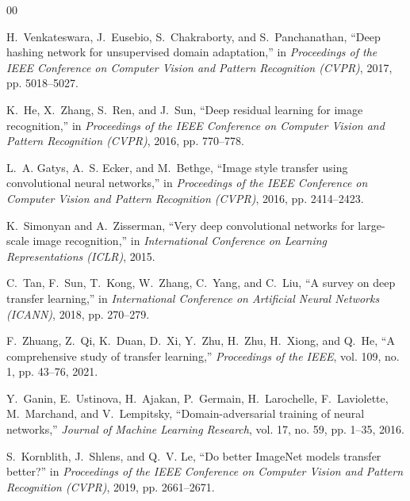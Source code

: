 \documentclass[conference]{IEEEtran}
\begin{document}
\FloatBarrier
\begin{thebibliography}{00}

H.~Venkateswara, J.~Eusebio, S.~Chakraborty, and S.~Panchanathan,
``Deep hashing network for unsupervised domain adaptation,''
in \textit{Proceedings of the IEEE Conference on Computer Vision and Pattern
Recognition (CVPR)}, 2017, pp. 5018--5027.

K.~He, X.~Zhang, S.~Ren, and J.~Sun,
``Deep residual learning for image recognition,''
in \textit{Proceedings of the IEEE Conference on Computer Vision and Pattern
Recognition (CVPR)}, 2016, pp. 770--778.

L.~A. Gatys, A.~S. Ecker, and M.~Bethge,
``Image style transfer using convolutional neural networks,''
in \textit{Proceedings of the IEEE Conference on Computer Vision and Pattern
Recognition (CVPR)}, 2016, pp. 2414--2423.

K.~Simonyan and A.~Zisserman,
``Very deep convolutional networks for large-scale image recognition,''
in \textit{International Conference on Learning Representations (ICLR)}, 2015.

C.~Tan, F.~Sun, T.~Kong, W.~Zhang, C.~Yang, and C.~Liu,
``A survey on deep transfer learning,''
in \textit{International Conference on Artificial Neural Networks (ICANN)}, 2018,
pp. 270--279.

F.~Zhuang, Z.~Qi, K.~Duan, D.~Xi, Y.~Zhu, H.~Zhu, H.~Xiong, and Q.~He,
``A comprehensive study of transfer learning,''
\textit{Proceedings of the IEEE}, vol. 109, no. 1, pp. 43--76, 2021.

Y.~Ganin, E.~Ustinova, H.~Ajakan, P.~Germain, H.~Larochelle, F.~Laviolette,
M.~Marchand, and V.~Lempitsky,
``Domain-adversarial training of neural networks,''
\textit{Journal of Machine Learning Research}, vol. 17, no. 59, pp. 1--35, 2016.

S.~Kornblith, J.~Shlens, and Q.~V. Le,
``Do better ImageNet models transfer better?''
in \textit{Proceedings of the IEEE Conference on Computer Vision and Pattern
Recognition (CVPR)}, 2019, pp. 2661--2671.

\end{thebibliography}
\end{document}
